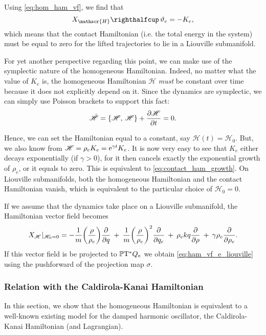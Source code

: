 Using \cref{eq:hom_ham_vf}, we find that 
\begin{equation}
     \intpr{X_\mathscr{H}}{\theta_e} = -K_e,
\end{equation}
which means that the contact Hamiltonian (i.e. the total energy in the system)
must be equal to zero for the lifted trajectories to lie in a Liouville submanifold.

For yet another perspective regarding this point, we can make use of the symplectic nature of the homogeneous Hamiltonian. Indeed, no matter what the value of \(K_e\) is, the homogeneous Hamiltonian \(\mathscr{H}\) \emph{must} be constant over time because it does not explicitly depend on it. Since the dynamics are symplectic, we can simply use Poisson brackets to support this fact:
\begin{equation}
     \dot{\mathscr{H}} = \qty{\mathscr{H},\,\mathscr{H}} + \pdv{\mathscr{H}}{t} = 0.
\end{equation}

Hence, we can set the Hamiltonian equal to a constant, say \(\mathscr{H}(t) = \mathscr{H}_0\). But, we also know from \(\mathscr{H} = \rho_e K_e = \mathrm{e}^{\gamma t} K_e\). It is now very easy to see that \(K_e\) either  decays exponentially (if \(\gamma > 0\)), for it then cancels exactly the exponential growth of \(\rho_e\), or it equals to zero. This is equivalent to \cref{eq:contact_ham_growth}. On Liouville submanifolds, both the homogeneous Hamiltonian and the contact Hamiltonian vanish, which is equivalent to the particular choice of \(\mathscr{H}_0 = 0\).

If we assume that the dynamics take place on a Liouville submanifold, the Hamiltonian vector field becomes
\begin{equation}
     X_\mathscr{H}\vert_{\mathscr{H}_0 = 0} =  -\frac{1}{m}\qty(\frac{\rho}{\rho_e})\pdv{}{q}\: + \: \frac{1}{m}\qty(\frac{\rho}{\rho_e})^2\pdv{}{q_e}\: + \: \rho_e kq \pdv{}{\rho}\: + \: \gamma \rho_e \pdv{}{\rho_e}.    
\end{equation}
If this vector field is be projected to \(\mathbb{P}\mathrm{T}^* Q_e\)  we obtain \cref{eq:ham_vf_e_liouville} using the pushforward of the projection map \(\sigma\).

\subsubsection{Relation with the Caldirola-Kanai Hamiltonian}
In this section, we show that the homogeneous Hamiltonian is equivalent to a well-known existing model for the damped harmonic oscillator, the Caldirola-Kanai Hamiltonian (and Lagrangian).

